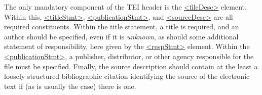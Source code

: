 The only mandatory component of the TEI header is the \hyperref[TEI.fileDesc]{<fileDesc>} element. Within this, \hyperref[TEI.titleStmt]{<titleStmt>}, \hyperref[TEI.publicationStmt]{<publicationStmt>}, and \hyperref[TEI.sourceDesc]{<sourceDesc>} are all required constituents. Within the title statement, a title is required, and an author should be specified, even if it is \textit{unknown}, as should some additional statement of responsibility, here given by the \hyperref[TEI.respStmt]{<respStmt>} element. Within the \hyperref[TEI.publicationStmt]{<publicationStmt>}, a publisher, distributor, or other agency responsible for the file must be specified. Finally, the source description should contain at the least a loosely structured bibliographic citation identifying the source of the electronic text if (as is usually the case) there is one.\par
